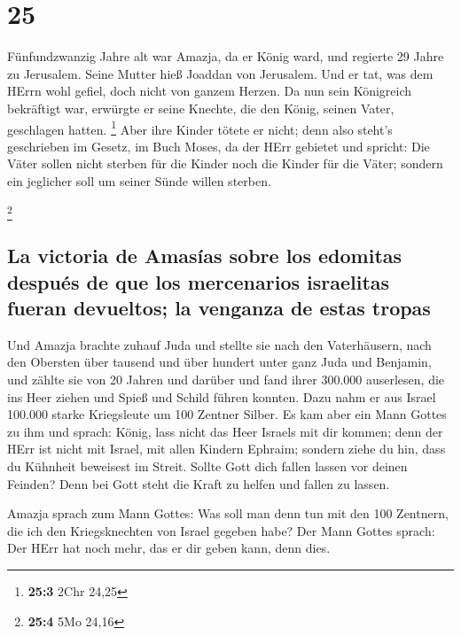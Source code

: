 \hypertarget{section-24}{%
\section{25}\label{section-24}}

 Fünfundzwanzig Jahre alt war Amazja, da er König ward,
und regierte 29 Jahre zu Jerusalem. Seine Mutter hieß Joaddan von
Jerusalem.  Und er tat, was dem HErrn wohl gefiel, doch
nicht von ganzem Herzen.  Da nun sein Königreich
bekräftigt war, erwürgte er seine Knechte, die den König, seinen Vater,
geschlagen hatten. \footnote{\textbf{25:3} 2Chr 24,25} 
Aber ihre Kinder tötete er nicht; denn also steht's geschrieben im
Gesetz, im Buch Moses, da der HErr gebietet und spricht: Die Väter
sollen nicht sterben für die Kinder noch die Kinder für die Väter;
sondern ein jeglicher soll um seiner Sünde willen sterben.

\footnote{\textbf{25:4} 5Mo 24,16}

\hypertarget{la-victoria-de-amasuxedas-sobre-los-edomitas-despuuxe9s-de-que-los-mercenarios-israelitas-fueran-devueltos-la-venganza-de-estas-tropas}{%
\subsection{La victoria de Amasías sobre los edomitas después de que los
mercenarios israelitas fueran devueltos; la venganza de estas
tropas}\label{la-victoria-de-amasuxedas-sobre-los-edomitas-despuuxe9s-de-que-los-mercenarios-israelitas-fueran-devueltos-la-venganza-de-estas-tropas}}

 Und Amazja brachte zuhauf Juda und stellte sie nach den
Vaterhäusern, nach den Obersten über tausend und über hundert unter ganz
Juda und Benjamin, und zählte sie von 20 Jahren und darüber und fand
ihrer 300.000 auserlesen, die ins Heer ziehen und Spieß und Schild
führen konnten.  Dazu nahm er aus Israel 100.000 starke
Kriegsleute um 100 Zentner Silber.  Es kam aber ein Mann
Gottes zu ihm und sprach: König, lass nicht das Heer Israels mit dir
kommen; denn der HErr ist nicht mit Israel, mit allen Kindern Ephraim;
 sondern ziehe du hin, dass du Kühnheit beweisest im
Streit. Sollte Gott dich fallen lassen vor deinen Feinden? Denn bei Gott
steht die Kraft zu helfen und fallen zu lassen.

 Amazja sprach zum Mann Gottes: Was soll man denn tun mit
den 100 Zentnern, die ich den Kriegsknechten von Israel gegeben habe?
Der Mann Gottes sprach: Der HErr hat noch mehr, das er dir geben kann,
denn dies.

